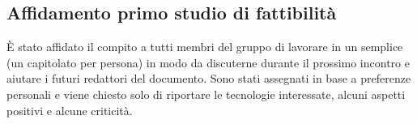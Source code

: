\subsection{Affidamento primo studio di fattibilità}
È stato affidato il compito a tutti membri del gruppo di lavorare in un semplice \SdF{} (un capitolato per persona) in modo da discuterne durante il prossimo incontro e aiutare i futuri redattori del documento. Sono stati assegnati in base a preferenze personali e viene chiesto solo di riportare le tecnologie interessate, alcuni aspetti positivi e alcune criticità.
